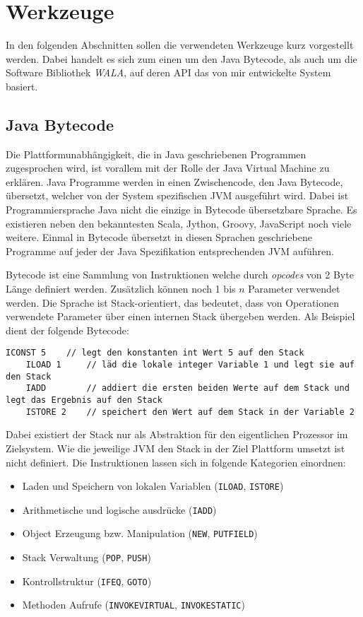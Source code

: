 \chapter{Werkzeuge}

In den folgenden Abschnitten sollen die verwendeten Werkzeuge kurz vorgestellt werden. Dabei handelt es 
sich zum einen um den Java Bytecode, als auch um die Software Bibliothek \textit{WALA}, auf deren API das 
von mir entwickelte System basiert. 

\section{Java Bytecode}

Die Plattformunabhängigkeit, die in Java geschriebenen Programmen zugesprochen wird, ist vorallem mit der 
Rolle der Java  Virtual Machine zu erklären. Java Programme werden in einen Zwischencode, den Java Bytecode, 
übersetzt, welcher von der System spezifischen JVM ausgeführt wird. Dabei ist Programmiersprache Java nicht 
die einzige in Bytecode übersetzbare Sprache. Es existieren neben den bekanntesten Scala, Jython, Groovy,
JavaScript noch viele weitere. Einmal in Bytecode übersetzt in diesen Sprachen geschriebene Programme auf 
jeder der Java Spezifikation entsprechenden JVM auführen. 

Bytecode ist eine Sammlung von Instruktionen welche durch \textit{opcodes} von 2 Byte Länge definiert 
werden. Zusätzlich können noch 1 bis $n$ Parameter verwendet werden. Die Sprache ist Stack-orientiert, das 
bedeutet, dass von Operationen verwendete Parameter über einen internen Stack übergeben werden. Als Beispiel 
dient der folgende Bytecode:

\begin{lstlisting}[language=Bytecode]
	ICONST 5 	// legt den konstanten int Wert 5 auf den Stack 
	ILOAD 1		// läd die lokale integer Variable 1 und legt sie auf den Stack
	IADD 		// addiert die ersten beiden Werte auf dem Stack und legt das Ergebnis auf den Stack
	ISTORE 2	// speichert den Wert auf dem Stack in der Variable 2
\end{lstlisting} 

Dabei existiert der Stack nur als Abstraktion für den eigentlichen Prozessor im Zielsystem. Wie die 
jeweilige JVM den Stack in der Ziel Plattform umsetzt ist nicht definiert. Die Instruktionen lassen sich in 
folgende Kategorien einordnen:

\begin{itemize}
	\item Laden und Speichern von lokalen Variablen (\texttt{ILOAD}, \texttt{ISTORE})
	\item Arithmetische und logische ausdrücke (\texttt{IADD})
	\item Object Erzeugung bzw. Manipulation (\texttt{NEW}, \texttt{PUTFIELD})
	\item Stack Verwaltung (\texttt{POP}, \texttt{PUSH}) 
	\item Kontrollstruktur (\texttt{IFEQ}, \texttt{GOTO})
	\item Methoden Aufrufe (\texttt{INVOKEVIRTUAL}, \texttt{INVOKESTATIC})
\end{itemize}  


